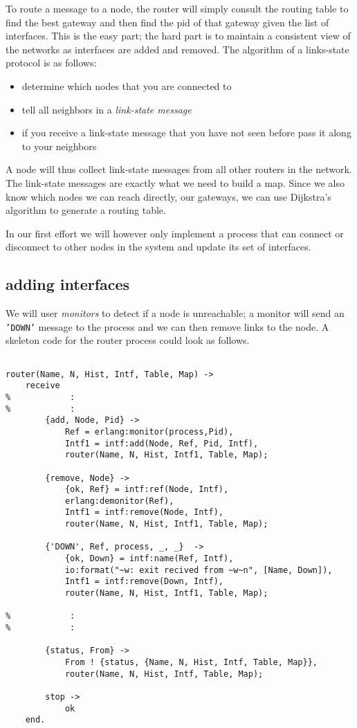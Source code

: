 \documentclass[a4paper, 11pt]{article}
\begin{document}
\noindent To route a message to a node, the router will simply consult the
routing table to find the best gateway and then find the pid of that
gateway given the list of interfaces. This is the easy part; the hard
part is to maintain a consistent view of the networks as interfaces
are added and removed. The algorithm of a links-state protocol is as follows:

\begin{itemize}
\item determine which nodes that you are connected to
\item tell all neighbors in a {\em link-state message}
\item if you receive a link-state message that you have not seen
before pass it along to your neighbors
\end{itemize}

\noindent A node will thus collect link-state messages from all other
routers in the network. The link-state messages are exactly what we
need to build a map. Since we also know which nodes we can reach
directly, our gateways, we can use Dijkstra's algorithm to generate a
routing table. 

In our first effort we will however only implement a process that can
connect or disconnect to other nodes in the system and update its set
of interfaces.

\subsection{adding interfaces}

We will user {\em monitors} to detect if a node is
unreachable; a monitor will send an {\tt 'DOWN'} message to the
process and we can then remove links to the node. A skeleton code for
the router process could look as follows.

\begin{verbatim}

router(Name, N, Hist, Intf, Table, Map) ->
    receive 
%            :
%            :
        {add, Node, Pid} ->
            Ref = erlang:monitor(process,Pid),
            Intf1 = intf:add(Node, Ref, Pid, Intf),
            router(Name, N, Hist, Intf1, Table, Map);

        {remove, Node} ->
            {ok, Ref} = intf:ref(Node, Intf),
            erlang:demonitor(Ref),
            Intf1 = intf:remove(Node, Intf),
            router(Name, N, Hist, Intf1, Table, Map);

        {'DOWN', Ref, process, _, _}  ->
            {ok, Down} = intf:name(Ref, Intf),
            io:format("~w: exit recived from ~w~n", [Name, Down]),
            Intf1 = intf:remove(Down, Intf),
            router(Name, N, Hist, Intf1, Table, Map);

%            :
%            :

        {status, From} ->
            From ! {status, {Name, N, Hist, Intf, Table, Map}},
            router(Name, N, Hist, Intf, Table, Map);                 

        stop ->
            ok
    end.
\end{verbatim}
\end{document}
